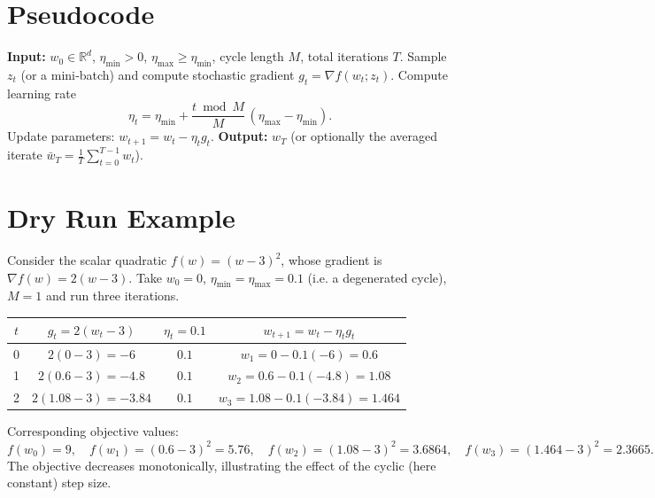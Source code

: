 \documentclass[11pt]{article}
\newcommand{\R}{\mathbb{R}}
\begin{document}
\section*{Pseudocode}
\begin{algorithm}[H]
\caption{Cyclic‑SGD}
\begin{algorithmic}[1]
\STATE \textbf{Input:} $w_{0}\in\R^{d}$, $\eta_{\min}>0$, $\eta_{\max}\ge\eta_{\min}$, cycle length $M$, total iterations $T$.
    \STATE Sample $z_{t}$ (or a mini‑batch) and compute stochastic gradient $g_{t}=\nabla f(w_{t};z_{t})$.
    \STATE Compute learning rate
    \[
    \eta_{t}= \eta_{\min}+ \frac{t\bmod M}{M}\,(\eta_{\max}-\eta_{\min}) .
    \]
    \STATE Update parameters: $w_{t+1}= w_{t}-\eta_{t} g_{t}$.
\ENDFOR
\STATE \textbf{Output:} $w_{T}$ (or optionally the averaged iterate $\bar w_{T}= \frac1T\sum_{t=0}^{T-1}w_{t}$).
\end{algorithmic}
\end{algorithm}

\section*{Dry Run Example}
Consider the scalar quadratic $f(w)=(w-3)^{2}$, whose gradient is $\nabla f(w)=2(w-3)$.  
Take $w_{0}=0$, $\eta_{\min}=\eta_{\max}=0.1$ (i.e. a degenerated cycle), $M=1$ and run three iterations.

\begin{center}
\begin{tabular}{c|c|c|c}
$t$ & $g_{t}=2(w_{t}-3)$ & $\eta_{t}=0.1$ & $w_{t+1}=w_{t}-\eta_{t}g_{t}$ \\ \hline
0 & $2(0-3)=-6$ & $0.1$ & $w_{1}=0-0.1(-6)=0.6$ \\
1 & $2(0.6-3)=-4.8$ & $0.1$ & $w_{2}=0.6-0.1(-4.8)=1.08$ \\
2 & $2(1.08-3)=-3.84$ & $0.1$ & $w_{3}=1.08-0.1(-3.84)=1.464$ \\
\end{tabular}
\end{center}
Corresponding objective values:
\[
f(w_{0})=9,\quad f(w_{1})=(0.6-3)^{2}=5.76,\quad
f(w_{2})=(1.08-3)^{2}=3.6864,\quad
f(w_{3})=(1.464-3)^{2}=2.3665.
\]
The objective decreases monotonically, illustrating the effect of the cyclic (here constant) step size.

\end{document}
